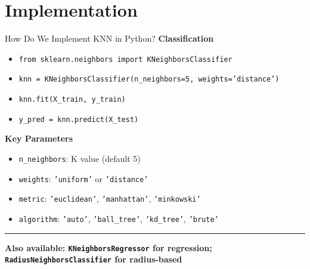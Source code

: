 \documentclass[8pt,aspectratio=169]{beamer}
\newcommand{\bottomnote}[1]{%
\vfill
\vspace{-2mm}
\textcolor{mllavender2}{\rule{\textwidth}{0.4pt}}
\vspace{1mm}
\footnotesize
\textbf{#1}
}
\begin{document}
\section{Implementation}

\begin{frame}[t]{How Do We Implement KNN in Python?}
\textbf{Classification}
\begin{itemize}
\item \texttt{from sklearn.neighbors import KNeighborsClassifier}
\item \texttt{knn = KNeighborsClassifier(n\_neighbors=5, weights='distance')}
\item \texttt{knn.fit(X\_train, y\_train)}
\item \texttt{y\_pred = knn.predict(X\_test)}
\end{itemize}
\vspace{0.5em}
\textbf{Key Parameters}
\begin{itemize}
\item \texttt{n\_neighbors}: K value (default 5)
\item \texttt{weights}: \texttt{'uniform'} or \texttt{'distance'}
\item \texttt{metric}: \texttt{'euclidean'}, \texttt{'manhattan'}, \texttt{'minkowski'}
\item \texttt{algorithm}: \texttt{'auto'}, \texttt{'ball\_tree'}, \texttt{'kd\_tree'}, \texttt{'brute'}
\end{itemize}
\bottomnote{Also available: \texttt{KNeighborsRegressor} for regression; \texttt{RadiusNeighborsClassifier} for radius-based}
\end{frame}
\end{document}
